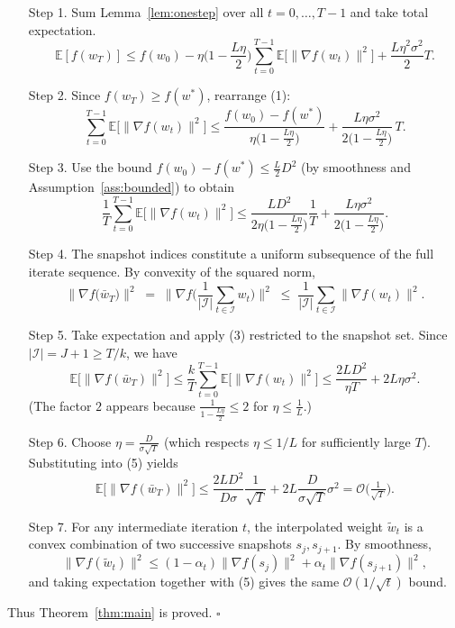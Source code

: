 \documentclass{article}
\newcommand{\E}{\mathbb{E}}
\begin{document}
\begin{enumerate}
\item[Step 1.] Sum Lemma~\ref{lem:onestep} over all $t=0,\dots,T-1$ and take total expectation.
\[
\E[f(w_T)]\le f(w_0)-\eta\Big(1-\frac{L\eta}{2}\Big)\sum_{t=0}^{T-1}\E\big[\|\nabla f(w_t)\|^2\big]
+\frac{L\eta^2\sigma^2}{2}T . \tag{1}
\]

\item[Step 2.] Since $f(w_T)\ge f(w^*)$, rearrange (1):
\[
\sum_{t=0}^{T-1}\E\big[\|\nabla f(w_t)\|^2\big]
\le
\frac{f(w_0)-f(w^*)}{\eta\big(1-\frac{L\eta}{2}\big)}+\frac{L\eta\sigma^2}{2\big(1-\frac{L\eta}{2}\big)}\,T .
\tag{2}
\]

\item[Step 3.] Use the bound $f(w_0)-f(w^*)\le \frac{L}{2}D^2$ (by smoothness and Assumption~\ref{ass:bounded}) to obtain
\[
\frac{1}{T}\sum_{t=0}^{T-1}\E\big[\|\nabla f(w_t)\|^2\big]
\le
\frac{L D^2}{2\eta\big(1-\frac{L\eta}{2}\big)}\frac{1}{T}+ \frac{L\eta\sigma^2}{2\big(1-\frac{L\eta}{2}\big)} .
\tag{3}
\]

\item[Step 4.] The snapshot indices constitute a uniform subsequence of the full iterate sequence. By convexity of the squared norm,
\[
\big\|\nabla f\big(\bar w_T\big)\big\|^2
\;=\;
\Big\|\nabla f\Big(\frac{1}{|\mathcal{I}|}\sum_{t\in\mathcal{I}} w_t\Big)\Big\|^2
\;\le\;
\frac{1}{|\mathcal{I}|}\sum_{t\in\mathcal{I}}\|\nabla f(w_t)\|^2 .
\tag{4}
\]

\item[Step 5.] Take expectation and apply (3) restricted to the snapshot set. Since $|\mathcal{I}|=J+1\ge T/k$, we have
\[
\E\big[\|\nabla f(\bar w_T)\|^2\big]
\le
\frac{k}{T}\sum_{t=0}^{T-1}\E\big[\|\nabla f(w_t)\|^2\big]
\le
\frac{2L D^2}{\eta T}+2L\eta\sigma^2 .
\tag{5}
\]
(The factor $2$ appears because $\frac{1}{1-\frac{L\eta}{2}}\le 2$ for $\eta\le\frac{1}{L}$.)

\item[Step 6.] Choose $\eta = \frac{D}{\sigma\sqrt{T}}$ (which respects $\eta\le 1/L$ for sufficiently large $T$). Substituting into (5) yields
\[
\E\big[\|\nabla f(\bar w_T)\|^2\big]\le
\frac{2LD^2}{D\sigma}\frac{1}{\sqrt{T}}+2L\frac{D}{\sigma\sqrt{T}}\sigma^2
= \mathcal{O}\!\big(\tfrac{1}{\sqrt{T}}\big).
\tag{6}
\]

\item[Step 7.] For any intermediate iteration $t$, the interpolated weight $\tilde w_t$ is a convex combination of two successive snapshots $s_j,s_{j+1}$. By smoothness,
\[
\|\nabla f(\tilde w_t)\|^2\le (1-\alpha_t)\|\nabla f(s_j)\|^2+\alpha_t\|\nabla f(s_{j+1})\|^2 ,
\]
and taking expectation together with (5) gives the same $\mathcal{O}(1/\sqrt{t})$ bound.
\end{enumerate}
Thus Theorem~\ref{thm:main} is proved. $\square$
\end{document}

